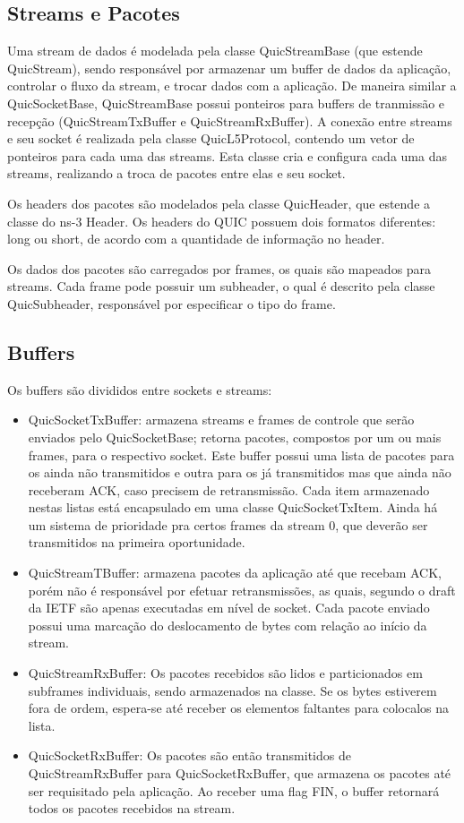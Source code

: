 \documentclass{article}
\begin{document}
\subsection{Streams e Pacotes}

Uma stream de dados é modelada pela classe QuicStreamBase (que estende QuicStream), sendo responsável por armazenar um
buffer de dados da aplicação, controlar o fluxo da stream, e trocar dados com a aplicação. De maneira similar a
QuicSocketBase, QuicStreamBase possui ponteiros para buffers de tranmissão e recepção (QuicStreamTxBuffer e
QuicStreamRxBuffer). A conexão entre streams e seu socket é realizada pela classe QuicL5Protocol, contendo um vetor de
ponteiros para cada uma das streams. Esta classe cria e configura cada uma das streams, realizando a troca de pacotes
entre elas e seu socket. 

Os headers dos pacotes são modelados pela classe QuicHeader, que estende a classe do ns-3 Header. Os headers do QUIC
possuem dois formatos diferentes: long ou short, de acordo com a quantidade de informação no header.

Os dados dos pacotes são carregados por frames, os quais são mapeados para streams. Cada frame pode possuir um
subheader, o qual é descrito pela classe QuicSubheader, responsável por especificar o tipo do frame. 

\subsection{Buffers}

Os buffers são divididos entre sockets e streams:
\begin{itemize}
\item QuicSocketTxBuffer: armazena streams e frames de controle que serão enviados pelo QuicSocketBase; retorna pacotes,
compostos por um ou mais frames, para o respectivo socket. Este buffer possui uma lista de pacotes para os ainda não
transmitidos e outra para os já transmitidos mas que ainda não receberam ACK, caso precisem de retransmissão. Cada item
armazenado nestas listas está encapsulado em uma classe QuicSocketTxItem. Ainda há um sistema de prioridade pra certos
frames da stream 0, que deverão ser transmitidos na primeira oportunidade.
\item QuicStreamTBuffer: armazena pacotes da aplicação até que recebam ACK, porém não é responsável por efetuar
retransmissões, as quais, segundo o draft da IETF são apenas executadas em nível de socket. Cada pacote enviado possui
uma marcação do deslocamento de bytes com relação ao início da stream. 
\item QuicStreamRxBuffer: Os pacotes recebidos são lidos e particionados em subframes individuais, sendo armazenados na
classe. Se os bytes estiverem fora de ordem, espera-se até receber os elementos faltantes para colocalos na lista. 
\item QuicSocketRxBuffer: Os pacotes são então transmitidos de QuicStreamRxBuffer para QuicSocketRxBuffer, que armazena
os pacotes até ser requisitado pela aplicação. Ao receber uma flag FIN, o buffer retornará todos os pacotes
recebidos na stream.
\end{itemize}
\end{document}

